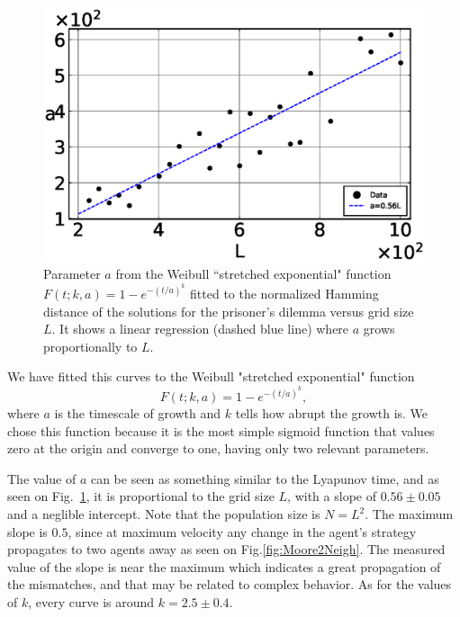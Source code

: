 \begin{figure}
	\centering
	\includegraphics[width=0.8\linewidth]{Images/P3/aVSL_PD.eps}
	\caption{Parameter $a$ from the Weibull ``stretched exponential" function $F(t;k,a)=1-e^{-(t/a)^k}$ fitted to the normalized Hamming distance of the solutions for the prisoner's dilemma versus grid size $L$. It shows a linear regression (dashed blue line) where $a$ grows proportionally to $L$.}
	\label{fig:aVSL_PD}
\end{figure}





We have fitted this curves to the Weibull "stretched exponential" function \cite{Weibull}
\begin{equation}
    F(t;k,a)=1-e^{-(t/a)^k},
    \label{WeibullDistr}
\end{equation}
where $a$ is the timescale of growth and $k$ tells how abrupt the growth is. We chose this function because it is the most simple sigmoid function that values zero at the origin and converge to one, having only two relevant parameters.

The value of $a$ can be seen as something similar to the Lyapunov time, and as seen on Fig.~\ref{fig:aVSL_PD}, it is proportional to the grid size $L$, with a slope of $0.56 \pm 0.05$ and a neglible intercept. Note that the population size is $N = L^2$. The maximum slope is $0.5$, since at maximum velocity any change in the agent's strategy propagates to two agents away as seen on Fig.\ref{fig:Moore2Neigh}. The measured value of the slope is near the maximum which indicates a great propagation of the mismatches, and that may be related to complex behavior. As for the values of $k$, every curve is around $k = 2.5\pm0.4$.





